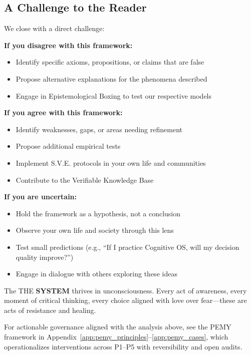 \documentclass[11pt,a4paper]{article}
\newcommand{\SYSTEM}{\textbf{SYSTEM}}
\theoremstyle{definition}
\theoremstyle{remark}
\begin{document}
\subsection{A Challenge to the Reader}

We close with a direct challenge:

\textbf{If you disagree with this framework:}
\begin{itemize}
    \item Identify specific axioms, propositions, or claims that are false
    \item Propose alternative explanations for the phenomena described
    \item Engage in Epistemological Boxing to test our respective models
\end{itemize}

\textbf{If you agree with this framework:}
\begin{itemize}
    \item Identify weaknesses, gaps, or areas needing refinement
    \item Propose additional empirical tests
    \item Implement S.V.E. protocols in your own life and communities
    \item Contribute to the Verifiable Knowledge Base
\end{itemize}

\textbf{If you are uncertain:}
\begin{itemize}
    \item Hold the framework as a hypothesis, not a conclusion
    \item Observe your own life and society through this lens
    \item Test small predictions (e.g., ``If I practice Cognitive OS, will my decision quality improve?'')
    \item Engage in dialogue with others exploring these ideas
\end{itemize}

The THE \SYSTEM{} thrives in unconsciousness. Every act of awareness, every moment of critical thinking, every choice aligned with love over fear---these are acts of resistance and healing.

\noindent
For actionable governance aligned with the analysis above, see the PEMY framework in Appendix~\ref{app:pemy_principles}--\ref{app:pemy_cases}, which operationalizes interventions across P1--P5 with reversibility and open audits.


\vspace{1em}
\end{document}
